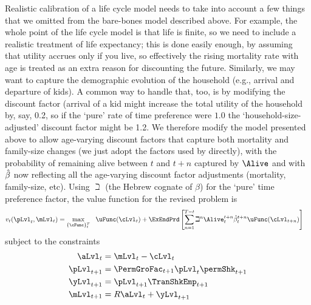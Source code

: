 Realistic calibration of a life cycle model needs to take into account a few things that we omitted from the bare-bones model described above. For example, the whole point of the life cycle model is that life is finite, so we need to include a realistic treatment of life expectancy; this is done easily enough, by assuming that utility accrues only if you live, so effectively the rising mortality rate with age is treated as an extra reason for discounting the future.  Similarly, we may want to capture the demographic evolution of the household (e.g., arrival and departure of kids).  A common way to handle that, too, is by modifying the discount factor (arrival of a kid might increase the total utility of the household by, say, 0.2, so if the `pure' rate of time preference were $1.0$ the `household-size-adjusted' discount factor might be 1.2.  We therefore modify the model presented above to allow age-varying discount factors that capture both mortality and family-size changes (we just adopt the factors used by \cite{cagettiWprofiles} directly), with the probability of remaining alive between $t$ and $t+n$ captured by $\Alive$ and with $\hat{\beta}$ now reflecting all the age-varying discount factor adjustments (mortality, family-size, etc).  Using $\beth$ (the Hebrew cognate of $\beta$) for the `pure' time preference factor, the value function for the revised problem is
  \begin{equation}\begin{gathered}\begin{aligned}
        \vFunc_{\prd}(\pLvl_{\prd},\mLvl_{\prd}) & =    \max_{\{\cFunc\}_{\prd}^{T}}~~ \uFunc(\cLvl_{\prd})+\ExEndPrd\left[\sum_{n=1}^{T-t}\beth^{n} \Alive_{\prd}^{t+n}\hat{\DiscFac}_{\prd}^{t+n} \uFunc(\cLvl_{t+n}) \right]   \label{eq:lifecyclemax}
      \end{aligned}\end{gathered}  \end{equation}
subject to the constraints
  \begin{equation*}\begin{gathered}\begin{aligned}
        \aLvl_{\prd}  & = \mLvl_{\prd}-\cLvl_{\prd}
        \\      \pLvl_{\prd+1}  & = \PermGroFac_{\prd+1}\pLvl_{\prd}\permShk_{\prd+1}
        \\      \yLvl_{\prd+1}  & = \pLvl_{\prd+1}\TranShkEmp _{\prd+1}
        \\      \mLvl_{\prd+1}  & = \Rfree \aLvl_{\prd}+\yLvl_{\prd+1}
      \end{aligned}\end{gathered}\end{equation*}

